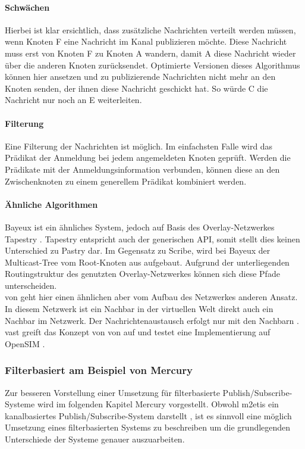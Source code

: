 \paragraph*{Schwächen}
Hierbei ist klar ersichtlich, dass zusätzliche Nachrichten verteilt werden müssen, wenn Knoten F eine Nachricht im Kanal publizieren möchte. Diese Nachricht muss erst von Knoten F zu Knoten A wandern, damit A diese Nachricht wieder über die anderen Knoten zurücksendet. Optimierte Versionen dieses Algorithmus können hier ansetzen und zu publizierende Nachrichten nicht mehr an den Knoten senden, der ihnen diese Nachricht geschickt hat. So würde C die Nachricht nur noch an E weiterleiten.

\paragraph*{Filterung}
Eine Filterung der Nachrichten ist möglich. Im einfachsten Falle wird das Prädikat der Anmeldung bei jedem angemeldeten Knoten geprüft. Werden die Prädikate mit der Anmeldungsinformation verbunden, können diese an den Zwischenknoten zu einem generellem Prädikat kombiniert werden.

\paragraph*{Ähnliche Algorithmen}
Bayeux \cite{Zhuang2001} ist ein ähnliches System, jedoch auf Basis des Overlay-Netzwerkes Tapestry \cite{Zhao2004Tapestry}. Tapestry entspricht auch der generischen API, somit stellt dies keinen Unterschied zu Pastry dar. Im Gegensatz zu Scribe, wird bei Bayeux der Multicast-Tree vom Root-Knoten aus aufgebaut. Aufgrund der unterliegenden Routingstruktur des genutzten Overlay-Netzwerkes können sich diese Pfade unterscheiden.\\
\ac{von} geht hier einen ähnlichen aber vom Aufbau des Netzwerkes anderen Ansatz. In diesem Netzwerk ist ein Nachbar in der virtuellen Welt direkt auch ein Nachbar im Netzwerk. Der Nachrichtenaustausch erfolgt nur mit den Nachbarn \cite{Hu2006VON}. \ac{vast} \cite{Backhaus2007Voronoibased} greift das Konzept von \ac{von} auf und testet eine Implementierung auf OpenSIM \cite{Baumgart2007OverSim}.



\subsubsection{Filterbasiert am Beispiel von Mercury}
\label{chap:related:mercury}
Zur besseren Vorstellung einer Umsetzung für filterbasierte Publish/Subscribe-Systeme wird im folgenden Kapitel Mercury \cite{Bharambe2004Mercury} vorgestellt. Obwohl \ac{m2etis} ein kanalbasiertes Publish/Subscribe-System darstellt \cite{Fischer2010a}, ist es sinnvoll eine möglich Umsetzung eines filterbasierten Systems zu beschreiben um die grundlegenden Unterschiede der Systeme genauer auszuarbeiten. 

